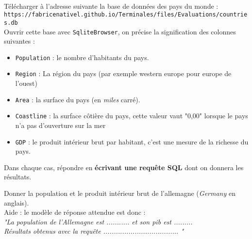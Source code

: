 \documentclass[11pt,a4paper]{article}
\begin{document}
\\
Télécharger à l'adresse suivante la base de données des pays du monde : \\
{\tt https://fabricenativel.github.io/Terminales/files/Evaluations/countries.db} \\
Ouvrir cette base avec {\tt SqliteBrowser}, on précise la signification des colonnes suivantes :
\begin{itemize}
\item {\tt Population} : le nombre d'habitants du pays.
\item {\tt Region} : La région du pays (par exemple {\sc western europe} pour europe de l'ouest)
\item {\tt Area} : la surface du pays (en \textit{miles} carré).
\item {\tt Coastline} : la surface côtière du pays, cette valeur vaut "0,00" lorsque le pays n'a pas d'ouverture sur la mer
\item {\tt GDP} : le produit intérieur brut par habitant, c'est une mesure de la richesse du pays.
\end{itemize}
\QListe
\item Dans chaque cas, répondre en \textbf{écrivant une requête SQL}  dont on donnera les résultats.
\SQListe
\item Donner la population et le produit intérieur brut de l'allemagne (\textit{Germany} en anglais).\\
\aide \; Aide : le modèle de réponse attendue est donc :\\
\textit{"La population de l'Allemagne est ........... et son {\sc pib} est ......... \\ Résultats obtenus avec la requête .................................... "}
\end{document}
